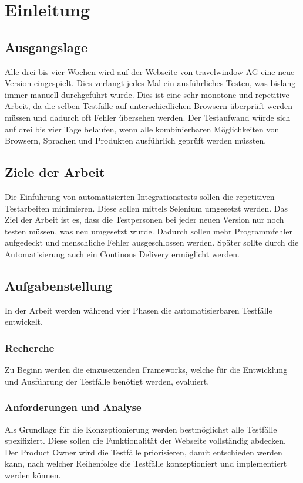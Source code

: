 \chapter{Einleitung}

\section{Ausgangslage}
Alle drei bis vier Wochen wird auf der Webseite von travelwindow AG eine neue Version eingespielt. Dies verlangt jedes Mal ein ausführliches Testen, was bislang immer manuell durchgeführt wurde. Dies ist eine sehr monotone und repetitive Arbeit, da die selben Testfälle auf unterschiedlichen Browsern überprüft werden müssen und dadurch oft Fehler übersehen werden. Der Testaufwand würde sich auf drei bis vier Tage belaufen, wenn alle kombinierbaren Möglichkeiten von Browsern, Sprachen und Produkten ausführlich geprüft werden müssten.

\section{Ziele der Arbeit}
\label{sec:desc:targets}
Die Einführung von automatisierten Integrationstests sollen die repetitiven Testarbeiten minimieren. Diese sollen mittels Selenium umgesetzt werden.
Das Ziel der Arbeit ist es, dass die Testpersonen bei jeder neuen Version nur noch testen müssen, was neu umgesetzt wurde.  Dadurch sollen mehr Programmfehler aufgedeckt und menschliche Fehler ausgeschlossen werden.
Später sollte durch die Automatisierung auch ein Continous Delivery ermöglicht werden.

\section{Aufgabenstellung}
In der Arbeit werden während vier Phasen die automatisierbaren Testfälle entwickelt. 

\subsection{Recherche}
Zu Beginn werden die einzusetzenden Frameworks, welche für die Entwicklung und Ausführung der Testfälle benötigt werden, evaluiert.

\subsection{Anforderungen und Analyse}
Als Grundlage für die Konzeptionierung werden bestmöglichst alle Testfälle spezifiziert. Diese sollen die Funktionalität der Webseite vollständig abdecken. Der Product Owner wird die Testfälle priorisieren, damit entschieden werden kann, nach welcher Reihenfolge die Testfälle konzeptioniert und implementiert werden können.

